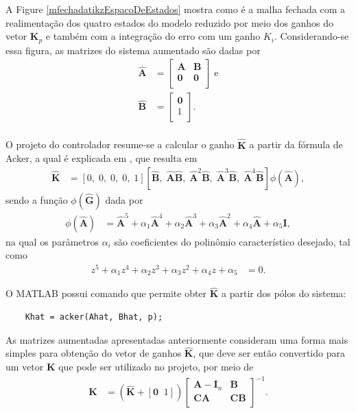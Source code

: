 A Figure \ref{mfechadatikzEspacoDeEstados} mostra como é a malha fechada com a realimentação dos quatro estados do modelo reduzido por meio dos ganhos do vetor $\mathbf{K}_p$ e também com a integração do erro com um ganho $K_i$. Considerando-se essa figura, as matrizes do sistema aumentado são dadas por \begin{align}
	\mathbf{\hat{A}} & = \left[\begin{array}{cc}
		\mathbf{A} & \mathbf{B}\\
		\mathbf{0} & \mathbf{0}\\
	\end{array}\right]\;\mathrm{e}\\
	\mathbf{\hat{B}} & = \left[\begin{array}{cc}
		\mathbf{0}\\
		1\\
	\end{array}\right].\\
\end{align}

O projeto do controlador resume-se a calcular o ganho $\mathbf{\hat{K}}$ a partir da fórmula de Acker, a qual é explicada em \cite{OgataDiscrete:1995}, que resulta em \begin{align}
	\mathbf{\hat{K}} & = \left[0,\; 0,\; 0,\; 0,\; 1\right]\left[\mathbf{\hat{B}},\; \mathbf{\hat{A}}\mathbf{\hat{B}},\; \mathbf{\hat{A}}^2\mathbf{\hat{B}},\; \mathbf{\hat{A}}^3\mathbf{\hat{B}},\; \mathbf{\hat{A}}^4\mathbf{\hat{B}}\right]\phi(\mathbf{\hat{A}}),
\end{align} sendo a função $\phi(\mathbf{\hat{G}})$ dada por \begin{align}
	\phi(\mathbf{\hat{A}}) &= \mathbf{\hat{A}}^5 + \alpha_1 \mathbf{\hat{A}}^4 + \alpha_2 \mathbf{\hat{A}}^3 + \alpha_3 \mathbf{\hat{A}}^2 + \alpha_4 \mathbf{\hat{A}} + \alpha_5 \mathbf{I},
\end{align} na qual os parâmetros $\alpha_i$ são coeficientes do polinômio característico desejado, tal como \begin{align}
	z^5 + \alpha_1 z^4 + \alpha_2 z^3 + \alpha_3 z^2 + \alpha_4 z + \alpha_5 & =0.
\end{align}

O MATLAB possui comando que permite obter $\mathbf{\hat{K}}$ a partir dos pólos do sistema:\begin{lstlisting}
	Khat = acker(Ahat, Bhat, p);
\end{lstlisting}

As matrizes aumentadas apresentadas anteriormente consideram uma forma mais simples para obtenção do vetor de ganhos $\mathbf{\hat{K}}$, que deve ser então convertido para um vetor $\mathbf{K}$ que pode ser utilizado no projeto, por meio de \begin{align}
	\mathbf{K} &= \left(\mathbf{\hat{K}}+[\mathbf{0}\;\; 1]\right)\left[\begin{array}{cc}
	\mathbf{A}-\mathbf{I}_n & \mathbf{B}\\
	\mathbf{C}\mathbf{A} & \mathbf{C}\mathbf{B}\\
\end{array}
\right]^{-1}.\label{obterK}
\end{align}

